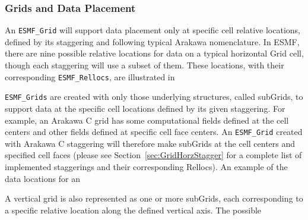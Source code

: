 \subsubsection{Grids and Data Placement}
\label{sec:GridDataPlacement}
An {\tt ESMF\_Grid} will support data placement only at specific cell relative
locations, defined by its staggering and following typical Arakawa nomenclature.
In ESMF, there are nine possible relative locations for data on a typical
horizontal Grid cell, though each staggering will use a subset of them.  These
locations, with their corresponding {\tt ESMF\_Rellocs}, are illustrated in


{\tt ESMF\_Grids} are created with only those underlying structures, called
subGrids, to support data at the specific cell locations defined by its given
staggering.  For example, an Arakawa C grid has some computational fields
defined at the cell centers and other fields defined at specific cell face
centers.  An {\tt ESMF\_Grid} created with Arakawa C staggering will therefore
make subGrids at the cell centers and specified cell faces (please see
Section~\ref{sec:GridHorzStagger} for a complete list of implemented staggerings
and their corresponding Rellocs).  An example of the data locations for an


A vertical grid is also represented as one or more subGrids, each corresponding
to a specific relative location along the defined vertical axis.  The possible


